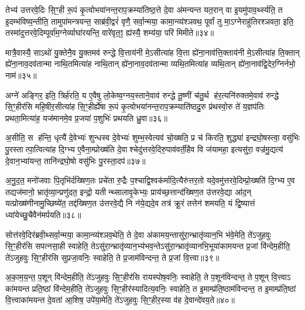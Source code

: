 तेभ्य॑ उत्तरवे॒दिः सि॒ꣳ॒ही रू॒पं कृ॒त्वोभया॑नन्त॒राप॒क्रम्या॑तिष्ठ॒त्ते दे॒वा अ॑मन्यन्त यत॒रान् वा इ॒यमु॑पाव॒र्थ्स्यति॒ त इ॒दम्भ॑विष्य॒न्तीति॒ तामुपा॑मन्त्रयन्त॒ साब्र॑वी॒द्वरं॑ वृणै॒ सर्वा॒न्मया॒ कामा॒न्व्य॑श्ञवथ॒ पूर्वां तु मा॒ऽग्नेराहु॑तिरश्ञवता॒ इति॒ तस्मा॑दुत्तरवे॒दिम्पूर्वा॑म॒ग्नेर्व्याघा॑रयन्ति॒ वारे॑वृत॒ꣵ॒ ह्य॑स्यै॒ शम्य॑या॒ परि॑ मिमीते॥३४॥

मात्रै॒वास्यै॒ साऽथो॑ यु॒क्तेनै॒व यु॒क्तमव॑ रुन्द्धे वि॒त्ताय॑नी मे॒ऽसीत्या॑ह वि॒त्ता ह्ये॑ना॒नाव॑त्ति॒क्ताय॑नी मे॒ऽसीत्या॑ह ति॒क्तान् ह्ये॑ना॒नाव॒दव॑तान्मा नाथि॒तमित्या॑ह नाथि॒तान् ह्ये॑ना॒नाव॒दव॑तान्मा व्यथि॒तमित्या॑ह व्यथि॒तान् ह्ये॑ना॒नाव॑द्वि॒देर॒ग्निर्नभो॒ नाम॑॥३५॥

अग्ने॑ अङ्गिर॒ इति॒ त्रिर्\mbox{}ह॑रति॒ य ए॒वैषु लो॒केष्व॒ग्नय॒स्ताने॒वाव॑ रुन्द्धे तू॒ष्णीं च॑तु॒र्थ ह॑र॒त्यनि॑रुक्तमे॒वाव॑ रुन्द्धे सि॒ꣳ॒हीर॑सि महि॒षीर॒सीत्या॑ह सि॒ꣳ॒हीर्\mbox{}ह्ये॑षा रू॒पं कृ॒त्वोभया॑नन्त॒राप॒क्रम्याति॑ष्ठदु॒रु प्र॑थस्वो॒रु ते॑ य॒ज्ञप॑तिः प्रथता॒मित्या॑ह॒ यज॑मानमे॒व प्र॒जया॑ प॒शुभिः॑ प्रथयति ध्रु॒वा॥३६॥

अ॒सीति॒ स ह॑न्ति॒ धृत्यै॑ दे॒वेभ्यः॑ शुन्धस्व दे॒वेभ्यः॑ शुम्भ॒स्वेत्यव॑ चो॒ख्षति॒ प्र च॑ किरति॒ शुद्ध्या॑ इन्द्रघो॒षस्त्वा॒ वसु॑भिः पु॒रस्तात्पा॒त्वित्या॑ह दि॒ग्भ्य ए॒वैना॒म्प्रोख्ष॑ति दे॒वाश्चेदु॑त्तरवे॒दिरु॒पाव॑वर्ती॒हैव वि ज॑यामहा॒ इत्यसु॑रा॒ वज्र॑मु॒द्यत्य॑ दे॒वान॒भ्या॑यन्त॒ तानि॑न्द्रघो॒षो वसु॑भिः पु॒रस्ता॒दप॑॥३७॥

अ॒नु॒द॒त॒ मनो॑जवाः पि॒तृभि॑र्दख्षिण॒तः प्रचे॑ता रु॒द्रैः प॒श्चाद्वि॒श्वक॑र्मादि॒त्यैरु॑त्तर॒तो यदे॒वमु॑त्तरवे॒दिम्प्रो॒ख्षति॑ दि॒ग्भ्य ए॒व तद्यज॑मानो॒ भ्रातृ॑व्या॒न्प्रणु॑दत॒ इन्द्रो॒ यतीन्थ्सालावृ॒केभ्यः॒ प्राय॑च्छ॒त्तान्द॑ख्षिण॒त उ॑त्तरवे॒द्या आ॑द॒न् यत्प्रोख्ष॑णीनामु॒च्छिष्ये॑त॒ तद्द॑ख्षिण॒त उ॑त्तरवे॒द्यै नि न॑ये॒द्यदे॒व तत्र॑ क्रू॒रं तत्तेन॑ शमयति॒ यं द्वि॒ष्यात्तं ध्या॑येच्छु॒चैवैन॑मर्पयति॥३८॥

{\anuvakamend[{मि॒मी॒ते॒ नाम॑ ध्रु॒वाऽप॑ शु॒चा त्रीणि॑ च॥७॥}]}

सोत्त॑रवे॒दिर॑ब्रवी॒थ्सर्वा॒न्मया॒ कामा॒न्व्य॑श्ञव॒थेति॒ ते दे॒वा अ॑कामय॒न्तासु॑रा॒न्भ्रातृ॑व्यान॒भि भ॑वे॒मेति॒ ते॑ऽजुहवुः सि॒ꣳ॒हीर॑सि सपत्नसा॒ही स्वाहेति॒ तेऽसु॑रा॒न्भ्रातृ॑व्यान॒भ्य॑भव॒न्तेऽसु॑रा॒न्भ्रातृ॑व्यानभि॒भूया॑कामयन्त प्र॒जां वि॑न्देम॒हीति॒ ते॑ऽजुहवुः सि॒ꣳ॒हीर॑सि सुप्रजा॒वनिः॒ स्वाहेति॒ ते प्र॒जाम॑विन्दन्त॒ ते प्र॒जां वि॒त्त्वा॥३९॥

अ॒का॒म॒य॒न्त॒ प॒शून् वि॑न्देम॒हीति॒ ते॑ऽजुहवुः सि॒ꣳ॒हीर॑सि रायस्पोष॒वनिः॒ स्वाहेति॒ ते प॒शून॑विन्दन्त॒ ते प॒शून् वि॒त्त्वाऽ का॑मयन्त प्रति॒ष्ठां वि॑न्देम॒हीति॒ ते॑ऽजुहवुः सि॒ꣳ॒हीर॑स्यादित्य॒वनिः॒ स्वाहेति॒ त इ॒माम्प्र॑ति॒ष्ठाम॑विन्दन्त॒ त इ॒माम्प्र॑ति॒ष्ठां वि॒त्त्वाका॑मयन्त दे॒वता॑ आ॒शिष॒ उपे॑या॒मेति॒ ते॑ऽजुहवुः सि॒ꣳ॒हीर॒स्या व॑ह दे॒वान्दे॑वय॒ते॥४०॥

